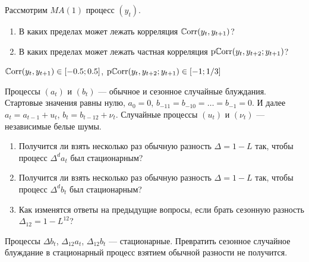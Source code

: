 \begin{problem}
  Рассмотрим $MA(1)$ процесс $(y_t)$. 
  \begin{enumerate}
    \item В каких пределах может лежать корреляция $\operatorname{\mathbb{C}\mathrm{orr}}(y_t, y_{t+1})$?
    \item В каких пределах может лежать частная корреляция $\operatorname{\mathrm{p}\mathbb{C}\mathrm{orr}}(y_t, y_{t+2} ; y_{t+1})$?
  \end{enumerate}
  
  \begin{sol}
    $\operatorname{\mathbb{C}\mathrm{orr}}(y_t, y_{t+1}) \in [-0.5; 0.5]$, $\operatorname{\mathrm{p}\mathbb{C}\mathrm{orr}}(y_t, y_{t+2} ; y_{t+1}) \in [-1; 1/3]$
  \end{sol}
\end{problem}





\begin{problem}
Процессы $(a_t)$ и $(b_t)$ — обычное и сезонное случайные блуждания. 
Стартовые значения равны нулю, $a_0=0$, $b_{-11} = b_{-10} = \ldots = b_{-1} = 0$.
И далее $a_t = a_{t-1} + u_t$, $b_t = b_{t-12} + \nu_t$. 
Случайные процессы $(u_t)$ и $(\nu_t)$ — независимые белые шумы. 

\begin{enumerate}
  \item Получится ли взять несколько раз обычную разность $\Delta = 1 - L$ так, чтобы процесс $\Delta^d a_t$ был стационарным? 
  \item Получится ли взять несколько раз обычную разность $\Delta = 1 - L$ так, чтобы процесс $\Delta^d b_t$ был стационарным? 
  \item Как изменятся ответы на предыдущие вопросы, если брать сезонную разность $\Delta_{12} = 1 - L^{12}$?
\end{enumerate}

  \begin{sol}
    Процессы $\Delta b_t$, $\Delta_{12} a_t$, $\Delta_{12} b_t$ — стационарные. 
    Превратить сезонное случайное блуждание в стационарный процесс взятием обычной разности не получится. 
  \end{sol}
\end{problem}


\begin{problem}


  \begin{sol}
  \end{sol}
\end{problem}


\begin{problem}


  \begin{sol}
  \end{sol}
\end{problem}
